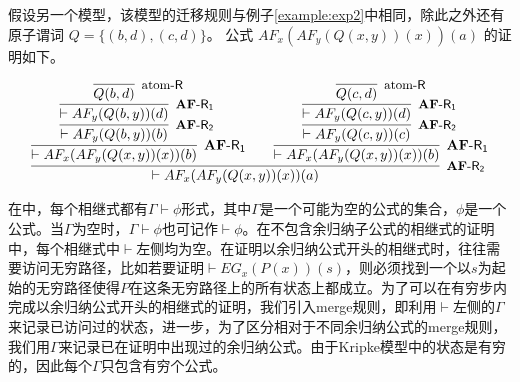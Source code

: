 \begin{example}\label{example:exp3}
		假设另一个模型，该模型的迁移规则与例子\ref{example:exp2}中相同，除此之外还有原子谓词 $Q=\{(b,d), (c,d)\}$。
		公式 $AF_x(AF_y(Q(x, y))(x))(a)$ 的证明如下。
		
		$$\infer[{\mbox{\small $\mathbf{AF}$-{$\mathsf{R_2}$}}}]
		{\vdash AF_x(AF_y(Q(x, y))(x))(a)}
		{\infer[\mbox{$\mathbf{AF}$-{$\mathsf{R_1}$}}]
			{\vdash AF_x(AF_y(Q(x, y))(x))(b)}
			{\infer[{\mbox{\small $\mathbf{AF}$-{$\mathsf{R_2}$}}}]
				{\vdash AF_y(Q(b, y))(b)}
				{\infer[\mbox{\small $\mathbf{AF}$-{$\mathsf{R_1}$}}]
					{\vdash AF_y(Q(b, y))(d)}
					{\infer[\mbox{\small atom-\textsf{R}}]
						{Q(b,d)}
						{}
					}
				}
			}
			\quad\quad
			\infer[\mbox{$\mathbf{AF}$-{$\mathsf{R_1}$}}]
			{\vdash AF_x(AF_y(Q(x, y))(x))(b)}
			{\infer[{\mbox{\small $\mathbf{AF}$-{$\mathsf{R_2}$}}}]
				{\vdash AF_y(Q(c, y))(c)}
				{\infer[\mbox{\small $\mathbf{AF}$-{$\mathsf{R_1}$}}]
					{\vdash AF_y(Q(c, y))(d)}
					{\infer[\mbox{\small atom-\textsf{R}}]
						{Q(c,d)}
						{}
					}
				}
			}
		}$$
		
\end{example}


在\SCTL{}中，每个相继式都有$\Gamma\vdash\phi$形式，其中$\Gamma$是一个可能为空的\CTLP{}公式的集合，$\phi$是一个\CTLP{}公式。当$\Gamma$为空时，$\Gamma\vdash\phi$也可记作$\vdash \phi$。在不包含余归纳子公式的相继式的证明中，每个相继式中$\vdash$左侧均为空。在证明以余归纳公式开头的相继式时，往往需要访问无穷路径，比如若要证明$\vdash EG_x(P(x))(s)$，则必须找到一个以$s$为起始的无穷路径使得$P$在这条无穷路径上的所有状态上都成立。为了可以在有穷步内完成以余归纳公式开头的相继式的证明，我们引入\textsf{merge}规则，即利用$\vdash$左侧的$\Gamma$来记录已访问过的状态，进一步，为了区分相对于不同余归纳公式的\textsf{merge}规则，我们用$\Gamma$来记录已在证明中出现过的余归纳公式。由于Kripke模型中的状态是有穷的，因此每个$\Gamma$只包含有穷个公式。



